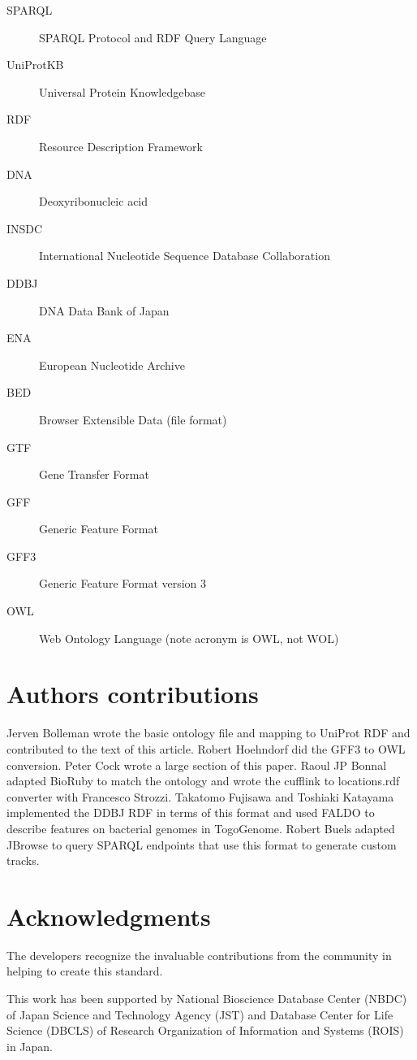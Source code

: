 \documentclass[10pt]{bmc_article}
\newenvironment{bmcformat}{\begin{raggedright}\baselineskip20pt\sloppy\setboolean{publ}{false}}{\end{raggedright}\baselineskip20pt\sloppy}
\begin{document}
\begin{bmcformat}
\begin{description}
\item[SPARQL] SPARQL Protocol and RDF Query Language
\item[UniProtKB] Universal Protein Knowledgebase 
\item[RDF] Resource Description Framework
\item[DNA] Deoxyribonucleic acid
\item[INSDC] International Nucleotide Sequence Database Collaboration
\item[DDBJ] DNA Data Bank of Japan
\item[ENA] European Nucleotide Archive
\item[BED] Browser Extensible Data (file format)
\item[GTF] Gene Transfer Format
\item[GFF] Generic Feature Format
\item[GFF3] Generic Feature Format version 3
\item[OWL] Web Ontology Language (note acronym is OWL, not WOL)
\end{description}
\bigskip

\section*{Authors contributions}

Jerven Bolleman wrote the basic ontology file and mapping to UniProt RDF and contributed to the text of this article.
Robert Hoehndorf did the GFF3 to OWL conversion.
Peter Cock wrote a large section of this paper.
Raoul JP Bonnal adapted BioRuby to match the ontology and wrote the cufflink to locations.rdf converter with Francesco Strozzi.
Takatomo Fujisawa and Toshiaki Katayama implemented the DDBJ RDF in terms of this format and used FALDO to describe features on bacterial genomes in TogoGenome.
Robert Buels adapted JBrowse to query SPARQL endpoints that use this format to generate custom tracks. 

\section*{Acknowledgments}
The developers recognize the invaluable contributions from the community in helping to create this standard.

This work has been supported by National Bioscience Database Center (NBDC) of Japan Science and Technology Agency (JST) and Database Center for Life Science (DBCLS) of Research Organization of Information and Systems (ROIS) in Japan.


\end{bmcformat}
\end{document}
